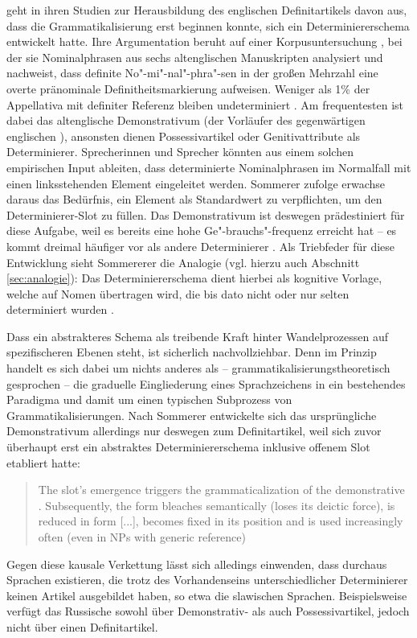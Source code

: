 \textcite{Sommerer2012,Sommerer2015} geht in ihren Studien zur Herausbildung des englischen Definitartikels davon aus, dass die Grammatikalisierung erst beginnen konnte,  sich ein Determiniererschema entwickelt hatte. Ihre Argumentation beruht auf einer  Korpusuntersuchung \parencite[vgl.][197f.]{Sommerer2012}, bei der sie Nominalphrasen aus sechs altenglischen Manuskripten analysiert und nachweist, dass definite No"-mi"-nal"-phra"-sen in der großen Mehrzahl eine overte pränominale Definitheitsmarkierung aufweisen. Weniger als 1\% der Appellativa mit definiter Referenz bleiben undeterminiert \parencite[122]{Sommerer2015}. Am frequentesten ist dabei das altenglische Demonstrativum  (der Vorläufer des gegenwärtigen englischen ), ansonsten dienen Possessivartikel oder Genitivattribute als Determinierer. Sprecherinnen und Sprecher könnten aus einem solchen empirischen Input ableiten, dass determinierte Nominalphrasen im Normalfall mit einen linksstehenden Element eingeleitet werden. Sommerer zufolge erwachse daraus das Bedürfnis, ein Element als Standardwert zu verpflichten, um den Determinierer-Slot zu füllen. Das Demonstrativum  ist deswegen prädestiniert für diese Aufgabe, weil es bereits eine hohe Ge"-brauchs"-frequenz erreicht hat -- es kommt dreimal häufiger vor als andere Determinierer \parencite[125]{Sommerer2015}. Als Triebfeder für diese Entwicklung sieht Sommererer die Analogie (vgl. hierzu auch Abschnitt \ref{sec:analogie}): Das Determiniererschema dient hierbei als kognitive Vorlage, welche auf Nomen übertragen wird, die bis dato nicht oder nur selten determiniert wurden \parencite[125]{Sommerer2015}. 

Dass ein abstrakteres Schema als treibende Kraft hinter Wandelprozessen auf spezifischeren Ebenen steht, ist sicherlich nachvollziehbar. 
Denn im Prinzip handelt es sich dabei um nichts anderes als -- grammatikalisierungstheoretisch gesprochen -- die graduelle Eingliederung eines Sprachzeichens in ein bestehendes Paradigma und damit um einen typischen Subprozess von Grammatikalisierungen. Nach Sommerer entwickelte sich das ursprüngliche Demonstrativum allerdings nur deswegen zum Definitartikel, weil sich zuvor überhaupt erst ein abstraktes Determiniererschema inklusive offenem Slot etabliert hatte: \blockcquote[205]{Sommerer2012}{The slot’s emergence triggers the grammaticalization of the demonstrative . Subsequently, the form bleaches semantically (loses its deictic force), is reduced in form [...], becomes fixed in its position and is used increasingly often (even
in NPs with generic reference)}. Gegen diese kausale Verkettung lässt sich alledings einwenden, dass durchaus Sprachen existieren, die trotz des Vorhandenseins unterschiedlicher Determinierer keinen Artikel ausgebildet haben, so etwa die slawischen Sprachen. Beispielsweise verfügt das Russische sowohl über Demonstrativ- als auch Possessivartikel, jedoch nicht über einen Definitartikel. 
 
